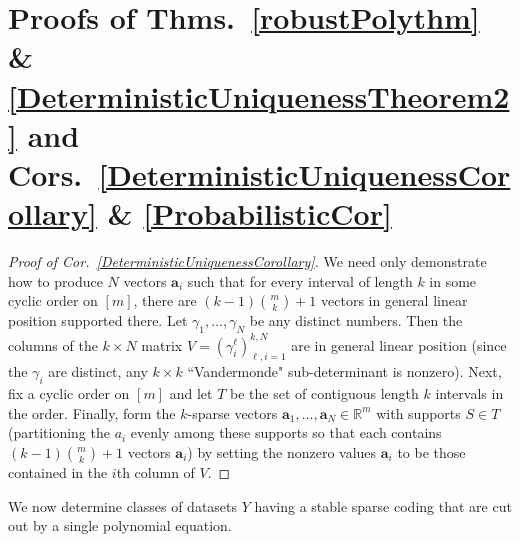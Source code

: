 \documentclass[journal, twocolumn]{IEEEtran}
\newtheorem{remark}{Remark}
\begin{document}

\section{Proofs of Thms.~\ref{robustPolythm} \& \ref{DeterministicUniquenessTheorem2} and Cors.~\ref{DeterministicUniquenessCorollary} \& \ref{ProbabilisticCor}}\label{AppendixB}

\begin{proof}[Proof of Cor.~\ref{DeterministicUniquenessCorollary}]
We need only demonstrate how to produce $N$ vectors $\mathbf{a}_i$ such that for every interval of length $k$ in some cyclic order on $[m]$, there are  \mbox{$(k-1){m \choose k}+1$} vectors in general linear position supported there. Let $\gamma_1, \ldots, \gamma_N$ be any distinct numbers. Then the columns of the $k \times N$ matrix $V = (\gamma^{\ell}_i)^{k,N}_{\ell,i=1}$ are in general linear position (since the $\gamma_i$ are distinct, any $k \times k$ ``Vandermonde" sub-determinant is nonzero). Next, fix a cyclic order on $[m]$ and let $T$ be the set of contiguous length $k$ intervals in the order. Finally, form the $k$-sparse vectors $\mathbf{a}_1, \ldots, \mathbf{a}_N \in \mathbb{R}^m$ with supports $S \in T$ (partitioning the $a_i$ evenly among these supports so that each contains $(k-1){m \choose k}+1$ vectors $\mathbf{a}_i$) by setting the nonzero values $\mathbf{a}_i$ to be those contained in the $i$th column of $V$.
\end{proof}

We now determine classes of datasets $Y$ having a stable sparse coding that are cut out by a single polynomial equation.
\end{document}
